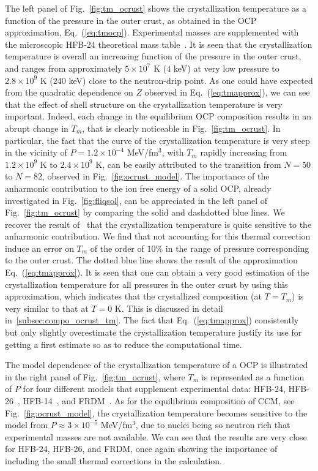 The left panel of Fig.~\ref{fig:tm_ocrust} shows the crystallization
temperature as a function of the pressure in the outer crust, as obtained in 
the OCP approximation, Eq.~(\ref{eq:tmocp}). 
Experimental masses are supplemented with the microscopic HFB-24 theoretical 
mass table~\cite{Goriely2013}. 
It is seen that the crystallization temperature is overall an increasing
function of the pressure in the outer crust, and ranges from approximately 
$5\times 10^7$ K ($4$ keV) at very low pressure to $2.8\times 10^9$ K ($240$ 
keV) close to the neutron-drip point.
As one could have expected from the quadratic dependence on $Z$ observed in 
Eq.~(\ref{eq:tmapprox}), we can see that the effect of shell structure on the 
crystallization temperature is very important. Indeed, each change in the 
equilibrium OCP composition results in an abrupt change in $T_m$, that is 
clearly noticeable in Fig.~\ref{fig:tm_ocrust}. In particular, the fact that 
the curve of the crystallization temperature is very steep in the vicinity of 
$P=1.2\times 10^{-4}$ MeV/fm$^3$, with $T_m$ rapidly increasing from 
$1.2\times 10^9$ K to $2.4\times 10^9$ K, can be easily attributed to the
transition from $N=50$ to $N=82$, observed in Fig.~\ref{fig:ocrust_model}.
The importance of the anharmonic contribution to the ion free energy of a 
solid OCP, already investigated in Fig.~\ref{fig:fliqsol}, can be appreciated 
in the left panel of Fig.~\ref{fig:tm_ocrust} by comparing the solid and 
dashdotted blue lines. We recover the result of~\cite{Fantina2020} that the 
crystallization temperature is quite sensitive to the anharmonic contribution.
We find that not accounting for this thermal correction induce an error on 
$T_m$ of the order of $10\%$ in the range of pressure corresponding to the 
outer crust.
The dotted blue line shows the result of the approximation 
Eq.~(\ref{eq:tmapprox}). It is seen that one can obtain a very good 
estimation of the crystallization temperature for all pressures in the outer 
crust by using this approximation, which indicates that the crystallized 
composition (at $T=T_m$) is very similar to that at $T=0$ K. This is discussed 
in detail in~\ref{subsec:compo_ocrust_tm}. The fact that 
Eq.~(\ref{eq:tmapprox}) consistently but only slightly overestimate the 
crystallization temperature justify its use for getting a first estimate so 
as to reduce the computational time. 

The model dependence of the crystallization temperature of a OCP is illustrated 
in the right panel of Fig.~\ref{fig:tm_ocrust}, where $T_m$ is represented as a
function of $P$ for four different models that supplement experimental data:
HFB-24, HFB-26~\cite{Goriely2013}, HFB-14~\cite{Goriely2007}, and
FRDM~\cite{Moller1995}. 
As for the equilibrium composition of CCM, see Fig.~\ref{fig:ocrust_model}, the 
crystallization temperature becomes sensitive to the model from $P \approx 
3\times 10^{-5}$ MeV/fm$^{3}$, due to nuclei being so neutron rich that 
experimental masses are not available. We can see that the results are very
close for HFB-24, HFB-26, and FRDM, once again showing the importance of
including the small thermal corrections in the calculation.

